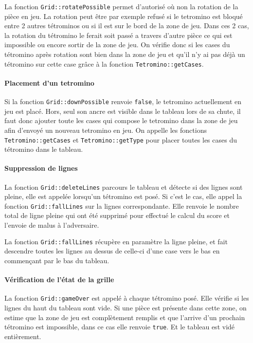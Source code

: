 \documentclass[a4paper, 12pt]{article}
\begin{document}
				La fonction \texttt{Grid::rotatePossible} permet d’autorisé où non la rotation de la pièce en jeu. La rotation peut être par exemple refusé si le tetromino est bloqué entre 2 autres tétrominos ou si il est sur le bord de la zone de jeu. Dans ces 2 cas, la rotation du tétromino le ferait soit passé a travers d’autre pièce ce qui est impossible ou encore sortir de la zone de jeu. On vérifie donc si les cases du tétromino après rotation sont bien dans la zone de jeu et qu'il n'y ai pas déjà un tétromino sur cette case grâce à la fonction \texttt{Tetromino::getCases}.

			\paragraph{Placement d’un tetromino}
				Si la fonction \texttt{Grid::downPossible} renvoie \texttt{false}, le tetromino actuellement en jeu est placé. Hors, seul son ancre est visible dans le tableau lors de sa chute, il faut donc ajouter toute les cases qui compose le tetromino dans la zone de jeu afin d’envoyé un nouveau tetromino en jeu.
				On appelle les fonctions \texttt{Tetromino::getCases} et \texttt{Tetromino::getType} pour placer toutes les cases du tétromino dans le tableau.

			\paragraph{Suppression de lignes}
				La fonction \texttt{Grid::deleteLines} parcours le tableau et détecte si des lignes sont pleine, elle est appelée lorsqu'un tétromino est posé.
				Si c’est le cas, elle appel la fonction \texttt{Grid::fallLines} sur la lignes correspondante.
				Elle renvoie le nombre total de ligne pleine qui ont été supprimé pour effectué le calcul du score et l’envoie de malus à l’adversaire.

				La fonction \texttt{Grid::fallLines} récupère en paramètre la ligne pleine, et fait descendre toutes les lignes au dessus de celle-ci d’une case vers le bas en commençant par le bas du tableau.

			\paragraph{Vérification de l’état de la grille}

				La fonction \texttt{Grid::gameOver} est appelé à chaque tétromino posé. Elle vérifie si les lignes du haut du tableau sont vide. Si une pièce est présente dans cette zone, on estime que la zone de jeu est complètement remplis et que l’arrive d’un prochain tétromino est impossible, dans ce cas elle renvoie \texttt{true}. Et le tableau est vidé entièrement.
\end{document}
